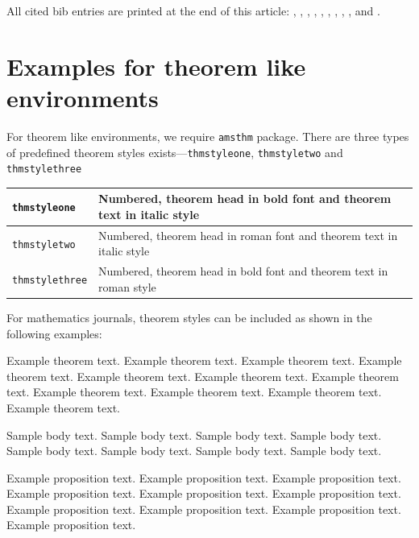 \documentclass{article}
\begin{document}
All cited bib entries are printed at the end of this article: \cite{bib3}, \cite{bib4}, \cite{bib5}, \cite{bib6}, \cite{bib7}, \cite{bib8}, \cite{bib9}, \cite{bib10}, \cite{bib11}, \cite{bib12} and \cite{bib13}.

\section{Examples for theorem like environments}\label{sec10}

For theorem like environments, we require \verb+amsthm+ package. There are three types of predefined theorem styles exists---\verb+thmstyleone+, \verb+thmstyletwo+ and \verb+thmstylethree+ 

\bigskip
\begin{tabular}{|l|p{19pc}|}
\hline
\verb+thmstyleone+ & Numbered, theorem head in bold font and theorem text in italic style \\\hline
\verb+thmstyletwo+ & Numbered, theorem head in roman font and theorem text in italic style \\\hline
\verb+thmstylethree+ & Numbered, theorem head in bold font and theorem text in roman style \\\hline
\end{tabular}
\bigskip

For mathematics journals, theorem styles can be included as shown in the following examples:

\begin{theorem}\label{thm1}
Example theorem text. Example theorem text. Example theorem text. Example theorem text. Example theorem text. 
Example theorem text. Example theorem text. Example theorem text. Example theorem text. Example theorem text. 
Example theorem text. 
\end{theorem}

Sample body text. Sample body text. Sample body text. Sample body text. Sample body text. Sample body text. Sample body text. Sample body text.

\begin{proposition}
Example proposition text. Example proposition text. Example proposition text. Example proposition text. Example proposition text. 
Example proposition text. Example proposition text. Example proposition text. Example proposition text. Example proposition text. 
\end{proposition}
\end{document}

